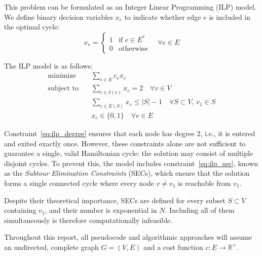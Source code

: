 This problem can be formulated as an Integer Linear Programming (ILP) model. We define binary decision variables $x_e$ to indicate whether edge $e$ is included in the optimal cycle:
\[
x_e =
\begin{cases}
1 & \text{if } e \in E^* \\
0 & \text{otherwise}
\end{cases}
\quad \forall e \in E
\]

The ILP model is as follows:
\begin{align}
\text{minimize} \quad & \sum_{e \in E} c_e x_e \label{eq:ilp_obj} \\
\text{subject to} \quad & \sum_{e \in \delta(v)} x_e = 2 \quad \forall v \in V \label{eq:ilp_degree} \\
& \sum_{e \in E(S)} x_e \leq |S| - 1 \quad \forall S \subset V,\, v_1 \in S \label{eq:ilp_sec} \\
& x_e \in \{0, 1\} \quad \forall e \in E \label{eq:ilp_binary}
\end{align}

Constraint~\eqref{eq:ilp_degree} ensures that each node has degree 2, i.e., it is entered and exited exactly once. 
However, these constraints alone are not sufficient to guarantee a single, valid Hamiltonian cycle: the solution may consist of multiple disjoint cycles. 
To prevent this, the model includes constraint~\eqref{eq:ilp_sec}, known as the \textit{Subtour Elimination Constraints} (SECs), 
which ensure that the solution forms a single connected cycle where every node $v \neq v_1$ is reachable from $v_1$.

Despite their theoretical importance, SECs are defined for every subset $S \subset V$ containing $v_1$, and their number is exponential in $N$. 
Including all of them simultaneously is therefore computationally infeasible.

Throughout this report, all pseudocode and algorithmic approaches will assume an undirected, complete graph $G = (V, E)$ and a cost function $c : E \rightarrow \mathbb{R}^+$.
